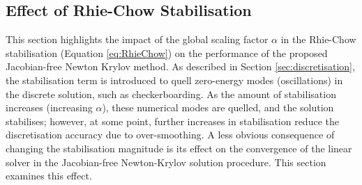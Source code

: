 \documentclass[sn-mathphys,Numbered]{sn-jnl}%
\begin{document}
\subsection{Effect of Rhie-Chow Stabilisation} \label{sec:RhieChowResults}
This section highlights the impact of the global scaling factor $\alpha$ in the Rhie-Chow stabilisation (Equation \ref{eq:RhieChow}) on the performance of the proposed Jacobian-free Newton Krylov method.
As described in Section \ref{sec:discretisation}, the stabilisation term is introduced to quell zero-energy modes (oscillations) in the discrete solution, such as checkerboarding.
As the amount of stabilisation increases (increasing $\alpha$), these numerical modes are quelled, and the solution stabilises; however, at some point, further increases in stabilisation reduce the discretisation accuracy due to over-smoothing.
A less obvious consequence of changing the stabilisation magnitude is its effect on the convergence of the linear solver in the Jacobian-free Newton-Krylov solution procedure.
This section examines this effect.
\end{document}
